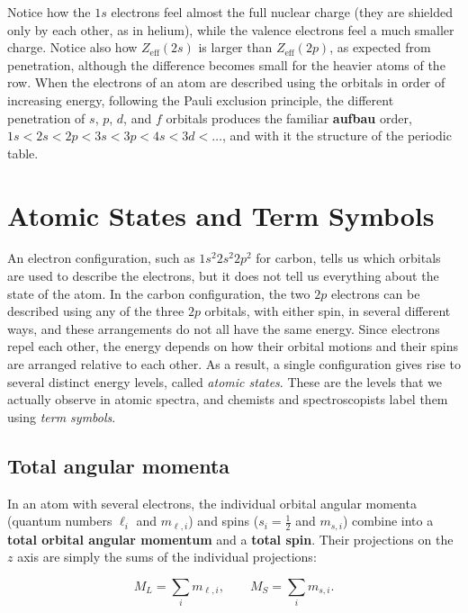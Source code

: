 \documentclass[
  english,
  9pt,
]{extbook}
\theoremstyle{definition}
\theoremstyle{definition}
\theoremstyle{definition}
\theoremstyle{definition}
\theoremstyle{remark}
\begin{document}
Notice how the \(1s\) electrons feel almost the full nuclear charge (they are shielded only by each other, as in helium), while the valence electrons feel a much smaller charge. Notice also how \(Z_\text{eff}(2s)\) is larger than \(Z_\text{eff}(2p)\), as expected from penetration, although the difference becomes small for the heavier atoms of the row. When the electrons of an atom are described using the orbitals in order of increasing energy, following the Pauli exclusion principle, the different penetration of \(s\), \(p\), \(d\), and \(f\) orbitals produces the familiar \textbf{aufbau} order, \(1s<2s<2p<3s<3p<4s<3d<\ldots\), and with it the structure of the periodic table.

\section{Atomic States and Term Symbols}\label{TermSymbols}

An electron configuration, such as \(1s^2 2s^2 2p^2\) for carbon, tells us which orbitals are used to describe the electrons, but it does not tell us everything about the state of the atom. In the carbon configuration, the two \(2p\) electrons can be described using any of the three \(2p\) orbitals, with either spin, in several different ways, and these arrangements do not all have the same energy. Since electrons repel each other, the energy depends on how their orbital motions and their spins are arranged relative to each other. As a result, a single configuration gives rise to several distinct energy levels, called \emph{atomic states}. These are the levels that we actually observe in atomic spectra, and chemists and spectroscopists label them using \emph{term symbols}.

\subsection{Total angular momenta}\label{total-angular-momenta}

In an atom with several electrons, the individual orbital angular momenta (quantum numbers \(\ell_i\) and \(m_{\ell,i}\)) and spins (\(s_i=\frac{1}{2}\) and \(m_{s,i}\)) combine into a \textbf{total orbital angular momentum} and a \textbf{total spin}. Their projections on the \(z\) axis are simply the sums of the individual projections:

\begin{equation}
M_L = \sum_i m_{\ell,i}, \qquad M_S = \sum_i m_{s,i}.
\label{eq:term1}
\end{equation}
\end{document}
